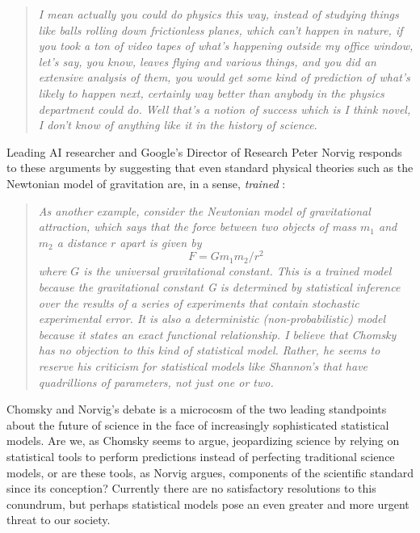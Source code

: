 \documentclass[twoside,11pt]{article}
\begin{document}
\begin{quotation}
\textsl{I mean actually you could do physics this way, instead of studying things like balls rolling down frictionless planes, which can't happen in nature, if you took a ton of video tapes of what's happening outside my office window, let's say, you know, leaves flying and various things, and you did an extensive analysis of them, you would get some kind of prediction of what's likely to happen next, certainly way better than anybody in the physics department could do. Well that's a notion of success which is I think novel, I don't know of anything like it in the history of science}.
\end{quotation}

Leading AI researcher and Google's Director of Research Peter Norvig responds to these arguments by suggesting that even standard physical theories such as the Newtonian model of gravitation are, in a sense, \emph{trained} \cite{norvig2017chomsky}:

\begin{quotation}
\textsl{As another example, consider the Newtonian model of gravitational attraction, which says that the force between two objects of mass $m_1$ and $m_2$ a distance $r$ apart is given by}
\begin{equation*}
F = G m_1 m_2 / r^2
\end{equation*}
\textsl{where $G$ is the universal gravitational constant. This is a trained model because the gravitational constant G is determined by statistical inference over the results of a series of experiments that contain stochastic experimental error. It is also a deterministic (non-probabilistic) model because it states an exact functional relationship. I believe that Chomsky has no objection to this kind of statistical model. Rather, he seems to reserve his criticism for statistical models like Shannon's that have quadrillions of parameters, not just one or two.}
\end{quotation}

Chomsky and Norvig's debate \cite{norvig2017chomsky} is a microcosm  of the two leading standpoints about the future of science in the face of increasingly sophisticated statistical models. Are we, as Chomsky seems to argue, jeopardizing science by relying on statistical tools to perform predictions instead of perfecting traditional science models, or are these tools, as Norvig argues, components of the scientific standard since its conception? Currently there are no satisfactory resolutions to this conundrum, but perhaps statistical models pose an even greater and more urgent threat to our society. 
\end{document}
